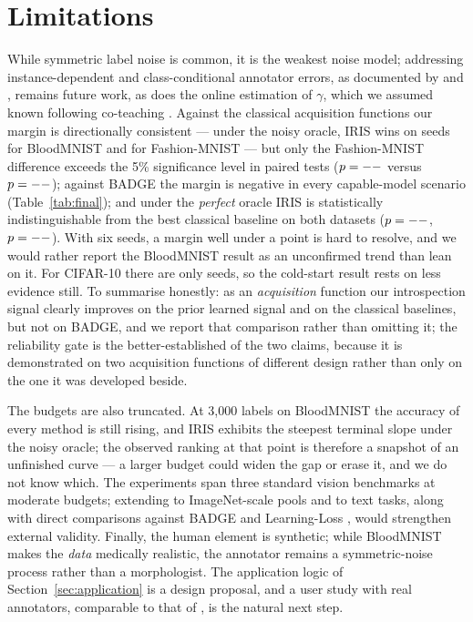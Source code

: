 \documentclass[a4paper,fleqn,longmktitle]{cas-sc}
\newcommand{\method}{IRIS}
\begin{document}
\section{Limitations}\label{sec:limitations}
While symmetric label noise is common, it is the weakest noise model;
addressing instance-dependent and class-conditional annotator errors,
as documented by \citet{hussain2026} and \citet{alves2025}, remains
future work, as does the online estimation of $\gamma$, which we
assumed known following co-teaching \citep{han2018}. Against the
classical acquisition functions our margin is directionally consistent
--- under the noisy oracle, \method{} wins on
\BloodNoisyIrisClassicSeedsWon{} seeds for BloodMNIST and
\FmnistNoisyIrisClassicSeedsWon{} for Fashion-MNIST --- but only the
Fashion-MNIST difference exceeds the 5\% significance level in paired
tests ($p=--$ versus
$p=--$); against BADGE the margin is negative
in every capable-model scenario (Table~\ref{tab:final}); and under the
\emph{perfect} oracle \method{} is statistically indistinguishable from
the best classical baseline on both datasets
($p=--$, $p=--$).
With six seeds, a margin well under a point is hard to resolve, and we
would rather report the BloodMNIST result as an unconfirmed trend than
lean on it. For CIFAR-10 there are only \CifarNoisyNSeeds{} seeds, so
the cold-start result rests on less evidence still. To summarise
honestly: as an \emph{acquisition} function our introspection signal
clearly improves on the prior learned signal and on the classical
baselines, but not on BADGE, and we report that comparison rather than
omitting it; the reliability gate is the better-established of the two
claims, because it is demonstrated on two acquisition functions of
different design rather than only on the one it was developed beside.

The budgets are also truncated. At 3,000 labels on BloodMNIST the
accuracy of every method is still rising, and \method{} exhibits the
steepest terminal slope under the noisy oracle; the observed ranking at
that point is therefore a snapshot of an unfinished curve --- a larger
budget could widen the gap or erase it, and we do not know which.
The experiments span three standard vision benchmarks at moderate
budgets; extending to ImageNet-scale pools and to text tasks, along
with direct comparisons against BADGE \citep{ash2020} and Learning-Loss
\citep{yoo2019}, would strengthen external validity. Finally, the human
element is synthetic; while BloodMNIST makes the \emph{data} medically
realistic, the annotator remains a symmetric-noise process rather than
a morphologist. The application logic of
Section~\ref{sec:application} is a design proposal, and a user study
with real annotators, comparable to that of \citet{petso2026}, is the
natural next step.
\end{document}
